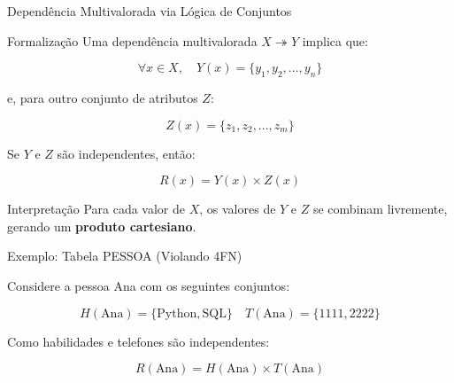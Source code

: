 \documentclass[9pt]{beamer}
\begin{document}
\begin{frame}{Dependência Multivalorada via Lógica de Conjuntos}
\small
\begin{block}{Formalização}
Uma dependência multivalorada $X \twoheadrightarrow Y$ implica que:

\[
\forall x \in X,\quad Y(x) = \{y_1, y_2, \ldots, y_n\}
\]

e, para outro conjunto de atributos $Z$:

\[
Z(x) = \{z_1, z_2, \ldots, z_m\}
\]

Se $Y$ e $Z$ são independentes, então:

\[
R(x) = Y(x) \times Z(x)
\]

\end{block}

\vspace{0.3cm}

\begin{exampleblock}{Interpretação}
Para cada valor de $X$, os valores de $Y$ e $Z$ se combinam livremente,
gerando um \textbf{produto cartesiano}.
\end{exampleblock}

\vspace{0.3cm}

\centering
{}
\end{frame}\begin{frame}{Exemplo: Tabela PESSOA (Violando 4FN)}
  \small
  
  Considere a pessoa Ana com os seguintes conjuntos:
  
  \[
  H(\text{Ana}) = \{\text{Python}, \text{SQL}\}
  \quad
  T(\text{Ana}) = \{1111, 2222\}
  \]

  \vspace{0.2cm}
  
  Como habilidades e telefones são independentes:
  
  \[
  R(\text{Ana}) = H(\text{Ana}) \times T(\text{Ana})
  \]

  \vspace{0.3cm}


\end{frame}
\end{document}

